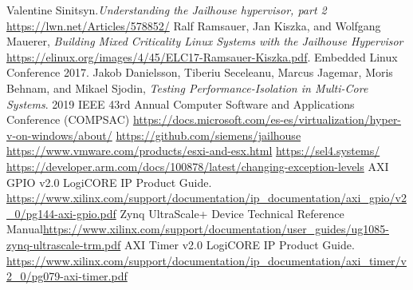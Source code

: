 \documentclass[spanish,12pt,a4paper,oneside]{book}
\begin{document}
\begin{thebibliography}{00}
   Valentine Sinitsyn.\emph{Understanding the Jailhouse hypervisor, part 2} \url{https://lwn.net/Articles/578852/}
   Ralf Ramsauer, Jan Kiszka, and Wolfgang Mauerer, \emph{Building Mixed Criticality Linux Systems with the Jailhouse Hypervisor} \url{https://elinux.org/images/4/45/ELC17-Ramsauer-Kiszka.pdf}. Embedded Linux Conference 2017.
   Jakob Danielsson, Tiberiu Seceleanu, Marcus Jagemar, Moris Behnam, and Mikael Sjodin, \emph{Testing Performance-Isolation in Multi-Core Systems}. 2019 IEEE 43rd Annual Computer Software and Applications Conference (COMPSAC)
	 \url{https://docs.microsoft.com/es-es/virtualization/hyper-v-on-windows/about/}
	 \url{https://github.com/siemens/jailhouse}
	 \url{https://www.vmware.com/products/esxi-and-esx.html}
	 \url{https://sel4.systems/}
	 \url{https://developer.arm.com/docs/100878/latest/changing-exception-levels}
   AXI GPIO v2.0 LogiCORE IP Product Guide. \url{https://www.xilinx.com/support/documentation/ip_documentation/axi_gpio/v2_0/pg144-axi-gpio.pdf}
   Zynq UltraScale+ Device Technical Reference Manual\url{https://www.xilinx.com/support/documentation/user_guides/ug1085-zynq-ultrascale-trm.pdf}
   AXI Timer v2.0 LogiCORE IP Product Guide. \url{https://www.xilinx.com/support/documentation/ip_documentation/axi_timer/v2_0/pg079-axi-timer.pdf}

\end{thebibliography}
\end{document}
